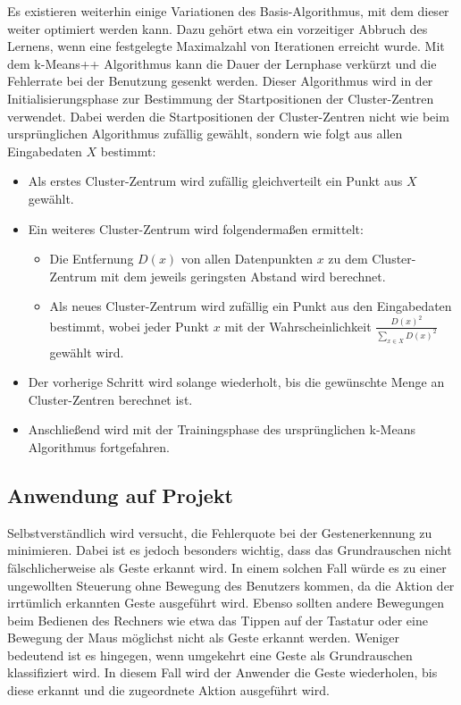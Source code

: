 Es existieren weiterhin einige Variationen des Basis-Algorithmus, mit dem dieser weiter optimiert werden kann. Dazu gehört etwa ein vorzeitiger Abbruch des Lernens, wenn eine festgelegte Maximalzahl von Iterationen erreicht wurde. Mit dem k-Means++ Algorithmus \cite{kMeans++} kann die Dauer der Lernphase verkürzt und die Fehlerrate bei der Benutzung gesenkt werden. Dieser Algorithmus wird in der Initialisierungsphase zur Bestimmung der Startpositionen der Cluster-Zentren verwendet. Dabei werden die Startpositionen der Cluster-Zentren nicht wie beim ursprünglichen Algorithmus zufällig gewählt, sondern wie folgt aus allen Eingabedaten $X$ bestimmt:
\begin{itemize}
\item Als erstes Cluster-Zentrum wird zufällig gleichverteilt ein Punkt aus $X$ gewählt.
\item Ein weiteres Cluster-Zentrum wird folgendermaßen ermittelt: 
\begin{itemize}
\item Die Entfernung $D(x)$ von allen Datenpunkten $x$ zu dem Cluster-Zentrum mit dem jeweils geringsten Abstand wird berechnet. 
\item Als neues Cluster-Zentrum wird zufällig ein Punkt aus den Eingabedaten bestimmt, wobei jeder Punkt $x$ mit der Wahrscheinlichkeit $\frac{ D(x)^{2} }{\sum\nolimits_{x \in X}D(x)^{2}}$ gewählt wird.
\end{itemize}
\item Der vorherige Schritt wird solange wiederholt, bis die gewünschte Menge an Cluster-Zentren berechnet ist.
\item Anschließend wird mit der Trainingsphase des ursprünglichen k-Means Algorithmus fortgefahren.
\end{itemize}


\subsection{Anwendung auf Projekt}
Selbstverständlich wird versucht, die Fehlerquote bei der Gestenerkennung zu minimieren. Dabei ist es jedoch besonders wichtig, dass das Grundrauschen nicht fälschlicherweise als Geste erkannt wird. In einem solchen Fall würde es zu einer ungewollten Steuerung ohne Bewegung des Benutzers kommen, da die Aktion der irrtümlich erkannten Geste ausgeführt wird. Ebenso sollten andere Bewegungen beim Bedienen des Rechners wie etwa das Tippen auf der Tastatur oder eine Bewegung der Maus möglichst nicht als Geste erkannt werden.
Weniger bedeutend ist es hingegen, wenn umgekehrt eine Geste als Grundrauschen klassifiziert wird. In diesem Fall wird der Anwender die Geste wiederholen, bis diese erkannt und die zugeordnete Aktion ausgeführt wird.

